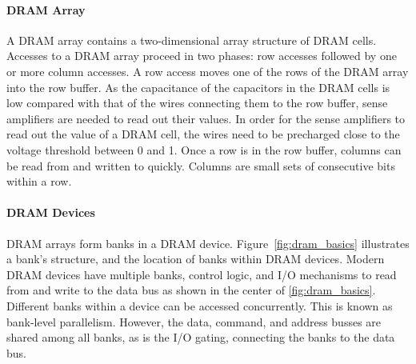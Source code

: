 \paragraph{DRAM Array}
A DRAM array contains a two-dimensional array structure of DRAM cells.
Accesses to a DRAM array proceed in two phases: row accesses followed by one or more column accesses.
A row access moves one of the rows of the DRAM array into the row buffer.
As the capacitance of the capacitors in the DRAM cells is low compared with that of the wires connecting them to the row buffer,
sense amplifiers are needed to read out their values.
In order for the sense amplifiers to read out the value of a DRAM cell, the wires need to be precharged close to the voltage threshold between 0 and 1.
Once a row is in the row buffer, columns can be read from and written to quickly.
Columns are small sets of consecutive bits within a row.



\paragraph{DRAM Devices}
DRAM arrays form banks in a DRAM device.
Figure~\ref{fig:dram_basics} illustrates a bank's structure, and the location of banks within DRAM devices.
Modern DRAM devices have multiple banks, control logic, and I/O mechanisms to read from and write to the data bus as shown in the center of \ref{fig:dram_basics}.
Different banks within a device can be accessed concurrently.
This is known as bank-level parallelism.
However, the data, command, and address busses are shared among all banks, as is the I/O gating, connecting the banks to the data bus.

